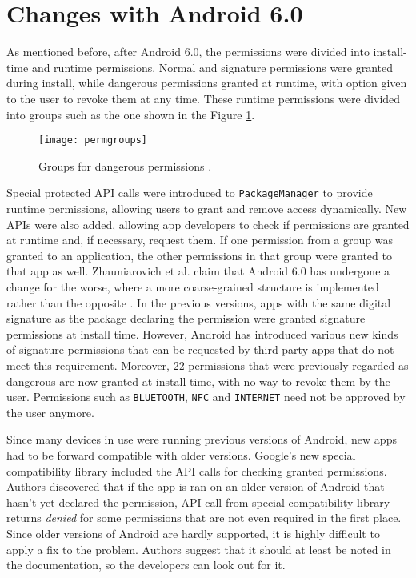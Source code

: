 \documentclass[
  a4paper,  %
  twoside,  %
  bibliography=totoc,
  headsepline,
  cleardoublepage=empty,
  parskip=half,
  draft=false,
  open=any
]{scrbook}
\begin{document}
\section{Changes with Android 6.0}
As mentioned before, after Android 6.0, the permissions were divided into install-time and runtime permissions. Normal and signature permissions were granted during install, while dangerous permissions granted at runtime, with option given to the user to revoke them at any time. These runtime permissions were divided into groups such as the one shown in the Figure \ref{permgroups}. 
\begin{figure}\centering
	\texttt{[image: permgroups]}
	\caption{Groups for dangerous permissions \cite{alepis2017}.}
	\label{permgroups}
\end{figure}
Special protected API calls were introduced to \texttt{PackageManager} to provide runtime permissions, allowing users to grant and remove access dynamically. New APIs were also added, allowing app developers to check if permissions are granted at runtime and, if necessary, request them. If one permission from a group was granted to an application, the other permissions in that group were granted to that app as well. Zhauniarovich et al. claim that Android 6.0 has undergone a change for the worse, where a more coarse-grained structure is implemented rather than the opposite \cite{zhauniarovich2016}. In the previous versions, apps with the same digital signature as the package declaring the permission were granted signature permissions at install time. However, Android has introduced various new kinds of signature permissions that can be requested by third-party apps that do not meet this requirement. Moreover, 22 permissions that were previously regarded as dangerous are now granted at install time, with no way to revoke them by the user. Permissions such as \texttt{BLUETOOTH}, \texttt{NFC} and \texttt{INTERNET} need not be approved by the user anymore.

Since many devices in use were running previous versions of Android, new apps had to be forward compatible with older versions. Google's new special compatibility library included the API calls for checking granted permissions. Authors discovered that if the app is ran on an older version of Android that hasn't yet declared the permission, API call from special compatibility library returns \textit{denied} for some permissions that are not even required in the first place. Since older versions of Android are hardly supported, it is highly difficult to apply a fix to the problem. Authors suggest that it should at least be noted in the documentation, so the developers can look out for it.
\end{document}

